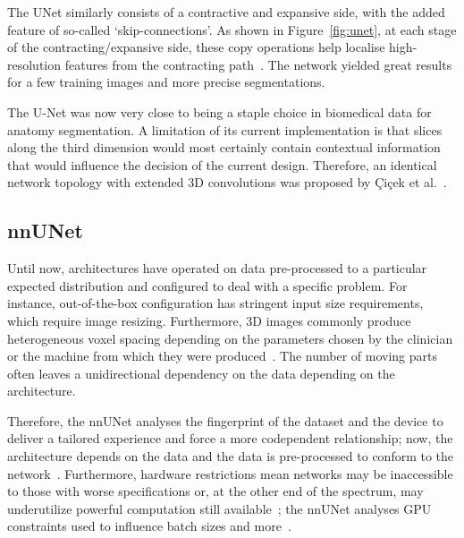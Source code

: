\documentclass[12pt,twoside]{report}
\begin{document}
The UNet similarly consists of a contractive and expansive side, with the added feature of so-called `skip-connections'. As shown in Figure~\ref{fig:unet}, at each stage of the contracting/expansive side, these copy operations help localise high-resolution features from the contracting path~\cite{U-Net}. The network yielded great results for a few training images and more precise segmentations.

The U-Net was now very close to being a staple choice in biomedical data for anatomy segmentation. A limitation of its current implementation is that slices along the third dimension would most certainly contain contextual information that would influence the decision of the current design. Therefore, an identical network topology with extended 3D convolutions was proposed by \c{C}i{\c{c}}ek et al.~\cite{DBLP:journals/corr/CicekALBR16}.


\subsection{nnUNet}

Until now, architectures have operated on data pre-processed to a particular expected distribution and configured to deal with a specific problem. For instance, out-of-the-box configuration has stringent input size requirements, which require image resizing. Furthermore, 3D images commonly produce heterogeneous voxel spacing depending on the parameters chosen by the clinician or the machine from which they were produced~\cite{nnunet}. The number of moving parts often leaves a unidirectional dependency on the data depending on the architecture. 

Therefore, the nnUNet analyses the fingerprint of the dataset and the device to deliver a tailored experience and force a more codependent relationship; now, the architecture depends on the data and the data is pre-processed to conform to the network~\cite{nnunet}. Furthermore, hardware restrictions mean networks may be inaccessible to those with worse specifications or, at the other end of the spectrum, may underutilize powerful computation still available~\cite{nnunet}; the nnUNet analyses GPU constraints used to influence batch sizes and more~\cite{nnunet-git-paper}.
\end{document}
